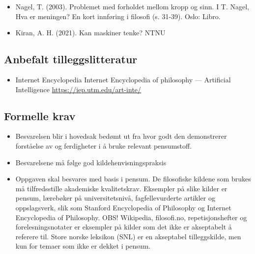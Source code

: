 \begin{itemize}
  \item
        Nagel, T. (2003). Problemet med forholdet mellom kropp og sinn. I T.
        Nagel, Hva er meningen? En kort innføring i filosofi (s. 31-39). Oslo:
        Libro.
  \item
        Kiran, A. H. (2021). Kan maskiner tenke? NTNU
\end{itemize}

\subsection{Anbefalt
  tilleggslitteratur}\label{anbefalt-tilleggslitteratur}

\begin{itemize}
  \item
        Internet Encyclopedia Internet Encyclopedia of philosophy ---
        Artificial Intelligence \url{https://iep.utm.edu/art-inte/}
\end{itemize}

\subsection{Formelle krav}\label{formelle-krav}

\begin{itemize}
  \item
        Besvarelsen blir i hovedsak bedømt ut fra hvor godt den demonstrerer
        forståelse av og ferdigheter i å bruke relevant pensumstoff.
  \item
        Besvarelsene må følge god kildehenvisningspraksis
  \item
        Oppgaven skal besvares med basis i pensum. De filosofiske kildene som
        brukes må tilfredsstille akademiske kvalitetskrav. Eksempler på slike
        kilder er pensum, lærebøker på universitetsnivå, fagfellevurderte
        artikler og oppslagsverk, slik som Stanford Encyclopedia of Philosophy
        og Internet Encyclopedia of Philosophy. OBS! Wikipedia, filosofi.no,
        repetisjonshefter og forelesningsnotater er eksempler på kilder som
        det ikke er akseptabelt å referere til. Store norske leksikon (SNL) er
        en akseptabel tilleggskilde, men kun for temaer som ikke er dekket i
        pensum.
\end{itemize}

